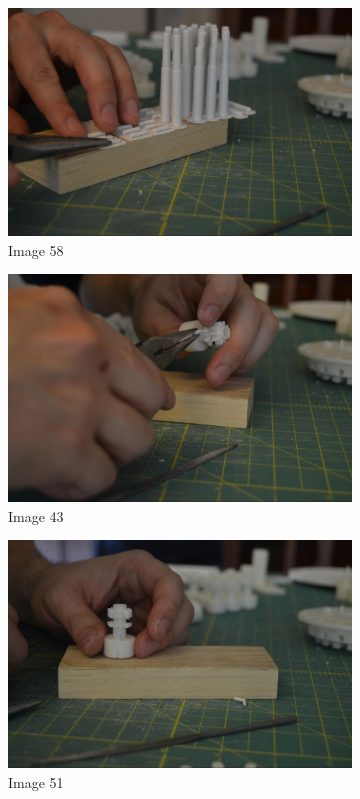 \documentclass[openany]{book}
\begin{document}
\begin{figure}[!ht]
	\centering
	\begin{subfigure}{.4\textwidth}
		\centering
		\includegraphics[width=.95\textwidth]{images/image58.jpg}
		\caption{Image 58}
		\label{fig:image58}	
	\end{subfigure}
	\begin{subfigure}{.4\textwidth}
		\centering
		\includegraphics[width=.95\textwidth]{images/image43.jpg}
		\caption{Image 43}
		\label{fig:image43}	
	\end{subfigure}
	
	\begin{subfigure}{.4\textwidth}
		\centering
		\includegraphics[width=.95\textwidth]{images/image51.jpg}
		\caption{Image 51}
		\label{fig:image51}	
	\end{subfigure}
	\caption{}
\end{figure}
\end{document}

